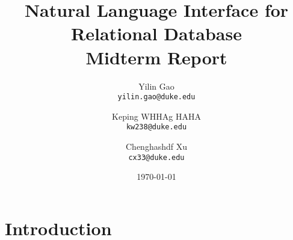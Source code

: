 \documentclass[twocolumn]{article}
\begin{document}
\title{Natural Language Interface for Relational Database\\
	\small{Midterm Report}}

\author{Yilin Gao \\
	\small \texttt{yilin.gao@duke.edu} \and 
	Keping WHHAg HAHA \\
	\small \texttt{kw238@duke.edu} \and 
	Chenghashdf Xu \\
	\small \texttt{cx33@duke.edu} }
	
\date{\today}
\maketitle

\section{Introduction}\label{sec:introduction}
\end{document}
